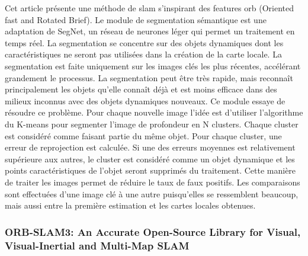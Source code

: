 \documentclass[11pt]{article}
\begin{document}
  Cet article \cite{jiRealtimeSemanticRGBD2021} présente une méthode de \acrshort{slam} s'inspirant des features \acrshort{orb} (Oriented \acrshort{fast} and Rotated Brief).
  Le module de segmentation sémantique est une adaptation de SegNet, un réseau de neurones léger qui permet un traitement en temps réel.
  La segmentation se concentre sur des objets dynamiques dont les caractéristiques ne seront pas utilisées dans la création de 
  la carte locale. La segmentation est faite uniquement sur les images clés les plus récentes, accélérant grandement le processus.
  La segmentation peut être très rapide, mais reconnaît principalement les objets qu'elle connaît déjà et est moins efficace dans des 
  milieux inconnus avec des objets dynamiques nouveaux. Ce module essaye de résoudre ce problème.
  Pour chaque nouvelle image l'idée est d'utiliser l'algorithme du K-means pour segmenter l'image de profondeur en N clusters.
  Chaque cluster est considéré comme faisant partie du même objet. Pour chaque cluster, une erreur de reprojection est calculée. Si une 
  des erreurs moyennes est relativement supérieure aux autres, le cluster est considéré comme un objet dynamique et les points caractéristiques
  de l'objet seront supprimés du traitement. Cette manière de traiter les images permet de réduire le taux de faux positifs. 
  Les comparaisons sont effectuées d'une image clé à une autre puisqu'elles se ressemblent beaucoup, mais aussi entre la première estimation
  et les cartes locales obtenues.

  \pagebreak

  \subsubsection{ORB-SLAM3: An Accurate Open-Source Library for Visual, Visual-Inertial and Multi-Map SLAM}
\end{document}
